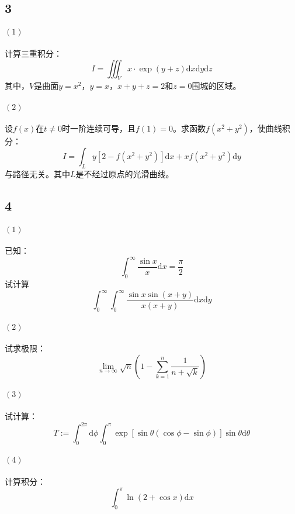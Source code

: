 \documentclass[a4paper,12pt]{article}
\begin{document}
\subsection*{3}
\paragraph{$\left(1\right)$}\noindent 计算三重积分：
\begin{equation*}
	I=\iiint_{V}x\cdot\exp(y+z)\mathrm{d}x\mathrm{d}y\mathrm{d}z
\end{equation*}
其中，$V$是曲面$y=x^2$，$y=x$，$x+y+z=2$和$z=0$围城的区域。
\paragraph{$\left(2\right)$}\noindent 设$f(x)$在$t\neq 0$时一阶连续可导，且$f(1)=0$。求函数$f(x^2+y^2)$，使曲线积分：
\begin{equation*}
	I=\int_{L}y\left[2-f\left(x^2+y^2\right)\right]\mathrm{d}x+xf\left(x^2+y^2\right)\mathrm{d}y
\end{equation*}
与路径无关。其中$L$是不经过原点的光滑曲线。
\subsection*{4}
\noindent \paragraph{$\left(1\right)$}
已知：
\begin{equation*}
	\int_{0}^{\infty}\frac{\sin x}{x}\mathrm{d}x=\frac{\pi}{2}
\end{equation*}
试计算
\begin{equation*}
	\int_{0}^{\infty}\int_{0}^{\infty}\frac{\sin x\sin\left(x+y\right)}{x\left(x+y\right)}\mathrm{d}x\mathrm{d}y
\end{equation*}
\noindent\paragraph{$\left(2\right)$}试求极限：
\begin{equation*}
	\lim\limits_{n\rightarrow\infty}\sqrt{n}\left(1-\sum_{k=1}^{n}\frac{1}{n+\sqrt{k}}\right)
\end{equation*}
\noindent\paragraph{$\left(3\right)$}试计算：
\begin{equation*}
	T:=\int_{0}^{2\pi}\mathrm{d}\phi\int_{0}^{\pi}\exp\left[\sin\theta\left(\cos\phi-\sin\phi\right)\right]\sin\theta\mathrm{d}\theta
\end{equation*}
\noindent\paragraph{$\left(4\right)$}计算积分：
\begin{equation*}
	\int_{0}^{\pi}\ln\left(2+\cos x\right)\mathrm{d}x
\end{equation*}
\end{document}
